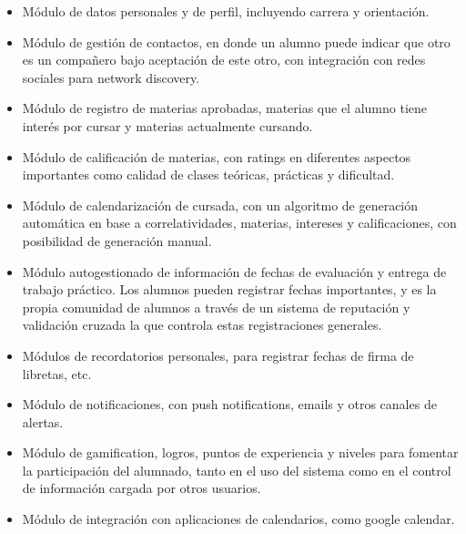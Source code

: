 \documentclass[a4paper,11pt]{article}
\begin{document}
\leftskip=36pt
\parindent=-18pt
\begin{itemize}
    \item Módulo de datos personales y de perfil, incluyendo carrera y orientación.

    \item Módulo de gestión de contactos, en donde un alumno puede indicar que 
    otro es un compañero bajo aceptación de este otro, con integración con redes 
    sociales para network discovery.

    \item Módulo de registro de materias aprobadas, materias que el alumno tiene 
    interés por cursar y materias actualmente cursando.

    \item Módulo de calificación de materias, con ratings en diferentes aspectos 
    importantes como calidad de clases teóricas, prácticas y dificultad.

    \item Módulo de calendarización de cursada, con un algoritmo de generación 
    automática en base a correlatividades, materias, intereses y calificaciones, con 
    posibilidad de generación manual.

    \item Módulo autogestionado de información de fechas de evaluación y entrega 
    de trabajo práctico. Los alumnos pueden registrar fechas importantes, y es la 
    propia comunidad de alumnos a través de un sistema de reputación y validación 
    cruzada la que controla estas registraciones generales.

    \item Módulos de recordatorios personales, para registrar fechas de firma de 
    libretas, etc.

    \item Módulo de notificaciones, con push notifications, emails y otros canales 
    de alertas.

    \item Módulo de gamification, logros, puntos de experiencia y niveles para fomentar 
    la participación del alumnado, tanto en el uso del sistema como en el control 
    de información cargada por otros usuarios.

    \item Módulo de integración con aplicaciones de calendarios, como google calendar.
\end{itemize}

\vspace{10pt}
\end{document}
